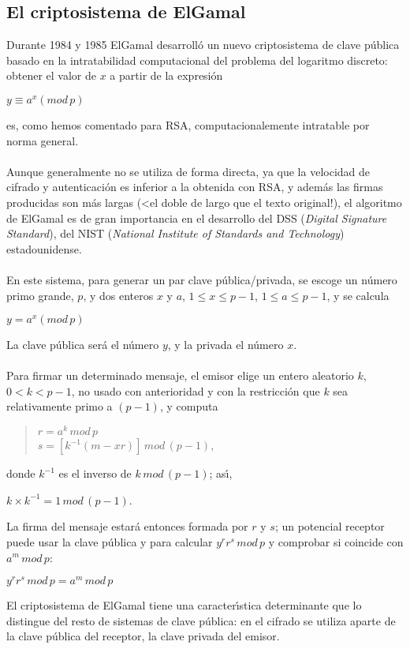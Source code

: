 \subsection{El criptosistema de ElGamal}
Durante 1984 y 1985 ElGamal desarroll\'o un nuevo criptosistema
de clave p\'ublica basado en la intratabilidad computacional del problema
del logaritmo discreto: obtener el valor de $x$ a partir de la expresi\'on
\begin{center}
$y\equiv a^{x}(mod\,p)$
\end{center}
es, como hemos comentado para RSA, computacionalemente intratable
por norma general.\\
\\Aunque generalmente no se utiliza de forma directa, ya que la velocidad
de cifrado y autenticaci\'on es inferior a la obtenida con RSA, y adem\'as
las firmas producidas son m\'as largas (<el doble de largo que el texto
original!), el algoritmo de ElGamal es de gran importancia en el desarrollo
del DSS ({\it Digital Signature Standard}), del NIST ({\it National Institute 
of Standards and Technology}) estadounidense.\\
\\En este sistema, para generar un par clave p\'ublica/privada, se
escoge un n\'umero primo grande, $p$, y dos enteros $x$ y $a$, 
$1\leq x\leq p-1$, $1\leq a\leq p-1$, y se calcula
\begin{center}
$y=a^{x}(mod\,p)$
\end{center}
La clave p\'ublica ser\'a el n\'umero $y$, y la privada el n\'umero $x$.\\
\\Para firmar un determinado mensaje, el emisor elige un entero aleatorio
$k$, $0<k<p-1$, no usado con anterioridad y con la restricci\'on
que $k$ sea relativamente primo a $(p-1)$, y computa
\begin{quote}
$r=a^{k}\,mod\,p$\\
$s=[k^{-1}(m-xr)]\,mod\,(p-1)$,
\end{quote}
donde $k^{-1}$ es el inverso de $k\, mod\, (p-1)$; as\'{\i},
\begin{center}
$k\times k^{-1}=1\, mod\, (p-1)$.
\end{center}
La firma del mensaje estar\'a entonces formada por $r$ y $s$; un potencial
receptor puede usar la clave p\'ublica y para calcular $y^{r} r^{s}\, mod\, p$
y comprobar si coincide con $a^{m}\,mod\,p$:
\begin{center}
$y^{r}r^{s}\,mod\,p= a^{m}\,mod\,p$
\end{center}
El criptosistema de ElGamal tiene una caracter\'{\i}stica determinante
que lo distingue del resto de sistemas de clave p\'ublica: en el cifrado
se utiliza aparte de la clave p\'ublica del receptor, la clave privada
del emisor.
